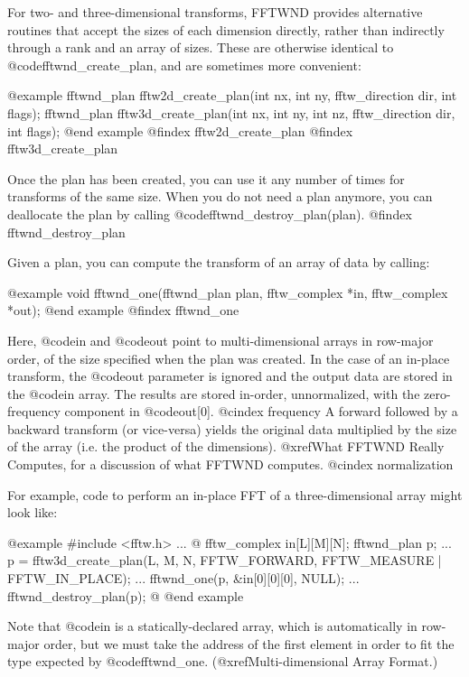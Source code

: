 For two- and three-dimensional transforms, FFTWND provides alternative
routines that accept the sizes of each dimension directly, rather than
indirectly through a rank and an array of sizes.  These are otherwise
identical to @code{fftwnd_create_plan}, and are sometimes more
convenient:

@example
fftwnd_plan fftw2d_create_plan(int nx, int ny,
                               fftw_direction dir, int flags);
fftwnd_plan fftw3d_create_plan(int nx, int ny, int nz,
                               fftw_direction dir, int flags);
@end example
@findex fftw2d_create_plan
@findex fftw3d_create_plan

Once the plan has been created, you can use it any number of times for
transforms of the same size.  When you do not need a plan anymore, you
can deallocate the plan by calling @code{fftwnd_destroy_plan(plan)}.
@findex fftwnd_destroy_plan

Given a plan, you can compute the transform of an array of data by
calling:

@example
void fftwnd_one(fftwnd_plan plan, fftw_complex *in, fftw_complex *out);
@end example
@findex fftwnd_one

Here, @code{in} and @code{out} point to multi-dimensional arrays in
row-major order, of the size specified when the plan was created.  In
the case of an in-place transform, the @code{out} parameter is ignored
and the output data are stored in the @code{in} array.  The results are
stored in-order, unnormalized, with the zero-frequency component in
@code{out[0]}.
@cindex frequency
A forward followed by a backward transform (or vice-versa) yields the
original data multiplied by the size of the array (i.e. the product of
the dimensions).  @xref{What FFTWND Really Computes}, for a discussion
of what FFTWND computes.
@cindex normalization

For example, code to perform an in-place FFT of a three-dimensional
array might look like:

@example
#include <fftw.h>
...
@{
     fftw_complex in[L][M][N];
     fftwnd_plan p;
     ...
     p = fftw3d_create_plan(L, M, N, FFTW_FORWARD,
                            FFTW_MEASURE | FFTW_IN_PLACE);
     ...
     fftwnd_one(p, &in[0][0][0], NULL);
     ...
     fftwnd_destroy_plan(p);  
@}
@end example

Note that @code{in} is a statically-declared array, which is
automatically in row-major order, but we must take the address of the
first element in order to fit the type expected by @code{fftwnd_one}.
(@xref{Multi-dimensional Array Format}.)

